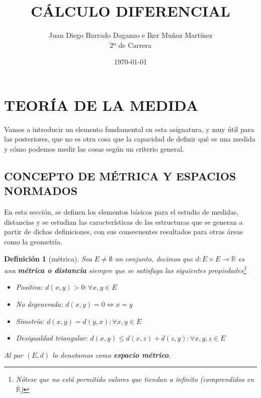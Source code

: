 \documentclass[10pt,a4paper,openright]{book}
\title{CÁLCULO DIFERENCIAL}
\author{Juan Diego Barrado Daganzo e Iker Muñoz Martínez\\2º de Carrera} %
\date{\today}
\theoremstyle{break}
\newtheorem*{defi}{Definición}
\begin{document}
\maketitle

\chapter*{TEORÍA DE LA MEDIDA}
Vamos a introducir un elemento fundamental en esta asignatura, y muy útil para las posteriores, que no es otra cosa que la capacidad de definir qué es una medida y cómo podemos medir las cosas según un criterio general.

\section*{CONCEPTO DE MÉTRICA Y ESPACIOS NORMADOS}
En esta sección, se definen los elementos básicos para el estudio de medidas, distancias y se estudian las características de las estructuras que se generan a partir de dichas definiciones, con sus consecuentes resultados para otras áreas como la geometría.

\begin{defi}[métrica]
Sea $E\neq \emptyset$ un conjunto, decimos que $d: E\times E \rightarrow \mathbb R$ es una \textbf{métrica o distancia} siempre que se satisfaga las siguientes propiedades\footnote{Nótese que no está permitido valores que tiendan a infinito (comprendidos en $\bar{\mathbb R}$)}
\begin{itemize}
\item Positiva: $d(x,y)>0: \forall x, y \in E$
\item No degenerada: $d(x,y) = 0 \Leftrightarrow x = y$
\item Simetría: $d(x,y) = d(y,x): \forall x,y \in E$
\item Desigualdad triangular: $d(x,y)\leq d(x,z)+ d(z,y): \forall x,y,z\in E$
\end{itemize}

Al par $(E,d)$ lo denotamos como \textbf{espacio métrico}.

\end{defi}
\end{document}

